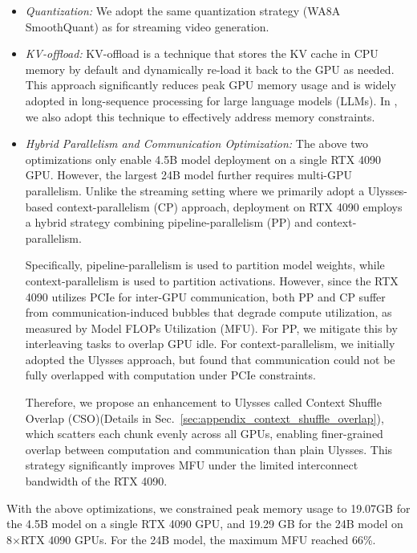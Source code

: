 \begin{itemize}
\item \emph{Quantization:} We adopt the same quantization strategy (WA8A SmoothQuant) as for streaming video generation.
\item \emph{KV-offload:} KV-offload is a technique that stores the KV cache in CPU memory by default and dynamically re-load it back to the GPU as needed. This approach significantly reduces peak GPU memory usage and is widely adopted in long-sequence processing for large language models (LLMs). In \magi, we also adopt this technique to effectively address memory constraints.

\item \emph{Hybrid Parallelism and Communication Optimization:} The above two optimizations only enable 4.5B model deployment on a single RTX 4090 GPU. However, the largest 24B model further requires multi-GPU parallelism. Unlike the streaming setting where we primarily adopt a Ulysses-based context-parallelism (CP) approach, deployment on RTX 4090 employs a hybrid strategy combining pipeline-parallelism (PP) and context-parallelism.

Specifically, pipeline-parallelism is used to partition model weights, while context-parallelism is used to partition activations. However, since the RTX 4090 utilizes PCIe for inter-GPU communication, both PP and CP suffer from communication-induced bubbles that degrade compute utilization, as measured by Model FLOPs Utilization (MFU). For PP, we mitigate this by interleaving tasks to overlap GPU idle. For context-parallelism, we initially adopted the Ulysses approach, but found that communication could not be fully overlapped with computation under PCIe constraints.

Therefore, we propose an enhancement to Ulysses called Context Shuffle Overlap (CSO)(Details in Sec.~\ref{sec:appendix_context_shuffle_overlap}), which scatters each chunk evenly across all GPUs, enabling finer-grained overlap between computation and communication than plain Ulysses. This strategy significantly improves MFU under the limited interconnect bandwidth of the RTX 4090. 
\end{itemize}

With the above optimizations, we constrained peak memory usage to 19.07GB for the 4.5B model on a single RTX 4090 GPU, and 19.29 GB for the 24B model on 8$\times$RTX 4090 GPUs. For the 24B model, the maximum MFU reached 66\%.





















